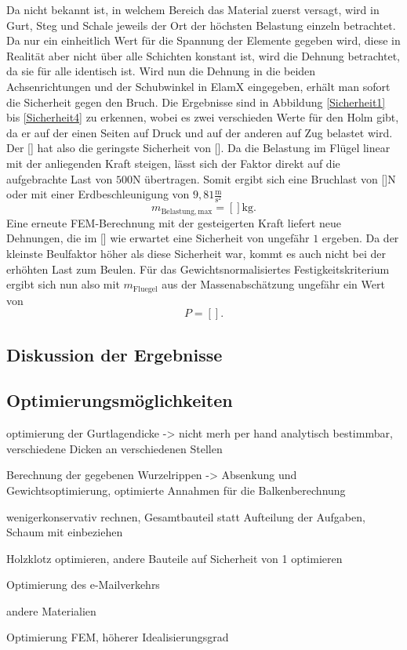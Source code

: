 Da nicht bekannt ist, in welchem Bereich das Material zuerst versagt, wird in Gurt, Steg und Schale jeweils der Ort der höchsten Belastung einzeln betrachtet. Da nur ein einheitlich Wert für die Spannung der Elemente gegeben wird, diese in Realität aber nicht über alle Schichten konstant ist, wird die Dehnung betrachtet, da sie für alle identisch ist. Wird nun die Dehnung in die beiden Achsenrichtungen und der Schubwinkel in ElamX eingegeben, erhält man sofort die Sicherheit gegen den Bruch. Die Ergebnisse sind in Abbildung \ref{Sicherheit1} bis \ref{Sicherheit4} zu erkennen, wobei es zwei verschieden Werte für den Holm gibt, da er auf der einen Seiten auf Druck und auf der anderen auf Zug belastet wird. Der [] hat also die geringste Sicherheit von []. Da die Belastung im Flügel linear mit der anliegenden Kraft steigen, lässt sich der Faktor direkt auf die aufgebrachte Last von $500\mathrm{N}$ übertragen. Somit ergibt sich eine Bruchlast von []N oder mit einer Erdbeschleunigung von $9,81\frac{\mathrm{m}}{\mathrm{s^2}}$
$$m_{\mathrm{Belastung,max}} = []\mathrm{kg}. $$ Eine erneute FEM-Berechnung mit der gesteigerten Kraft liefert neue Dehnungen, die im [] wie erwartet eine Sicherheit von ungefähr $1$ ergeben. Da der kleinste Beulfaktor höher als diese Sicherheit war, kommt es auch nicht bei der erhöhten Last zum Beulen.
Für das Gewichtsnormalisiertes Festigkeitskriterium ergibt sich nun also mit $m_{\mathrm{Fluegel}}$ aus der Massenabschätzung ungefähr ein Wert von
$$P = [].$$
\subsection{Diskussion der Ergebnisse}
\subsection{Optimierungsmöglichkeiten}
optimierung der Gurtlagendicke -> nicht merh per hand analytisch bestimmbar, verschiedene Dicken an verschiedenen Stellen

Berechnung der gegebenen Wurzelrippen -> Absenkung und Gewichtsoptimierung, optimierte Annahmen für die Balkenberechnung

wenigerkonservativ rechnen, Gesamtbauteil statt Aufteilung der Aufgaben, Schaum mit einbeziehen

Holzklotz optimieren, andere Bauteile auf Sicherheit von 1 optimieren

Optimierung des e-Mailverkehrs

andere Materialien 

Optimierung FEM, höherer Idealisierungsgrad